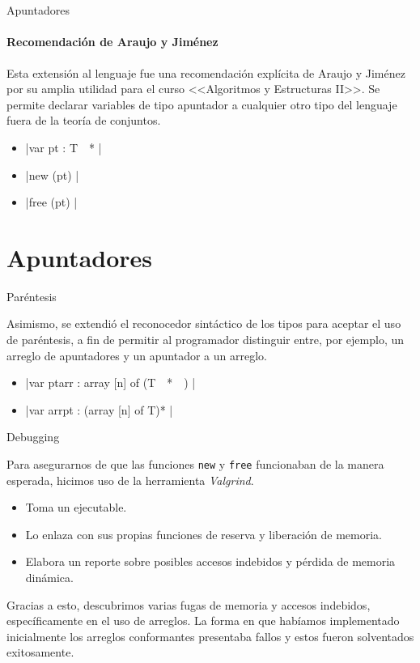 \section{ }

\begin{frame}{Apuntadores}
\framesubtitle{Recomendación de Araujo y Jiménez}
Esta extensión al lenguaje fue una recomendación explícita de Araujo y Jiménez
por su amplia utilidad para el curso <<Algoritmos y Estructuras II>>. Se permite
declarar variables de tipo apuntador a cualquier otro tipo del lenguaje fuera 
de la teoría de conjuntos.

\begin{itemize}
  \item{ \ingra|var pt : T~~* | }
  \item{ \ingra|new  (pt) | }
  \item{ \ingra|free (pt) | }
\end{itemize}
\end{frame}

\section{Apuntadores}

\begin{frame}{Paréntesis}

Asimismo, se extendió el reconocedor sintáctico de los tipos para aceptar el 
uso de paréntesis, a fin de permitir al programador distinguir entre, por 
ejemplo, un arreglo de apuntadores y un apuntador a un arreglo.

\begin{itemize}
  \item{ \ingra|var ptarr : array [n] of (T~~*~~) | }
  \item{ \ingra|var arrpt : (array [n] of T)* | }
\end{itemize}
\end{frame}

\begin{frame}{Debugging}

Para asegurarnos de que las funciones \texttt{new} y \texttt{free} funcionaban
de la manera esperada, hicimos uso de la herramienta \textit{Valgrind}. 
\begin{itemize}
  \item Toma un ejecutable.
  \item Lo enlaza con sus propias funciones de reserva y liberación de memoria.
  \item Elabora un reporte sobre posibles accesos indebidos y pérdida de memoria 
    dinámica.
\end{itemize}

Gracias a esto, descubrimos varias fugas de memoria y accesos indebidos, específicamente
en el uso de arreglos. La forma en que habíamos implementado inicialmente los arreglos conformantes presentaba fallos y estos fueron solventados exitosamente.
\end{frame}

